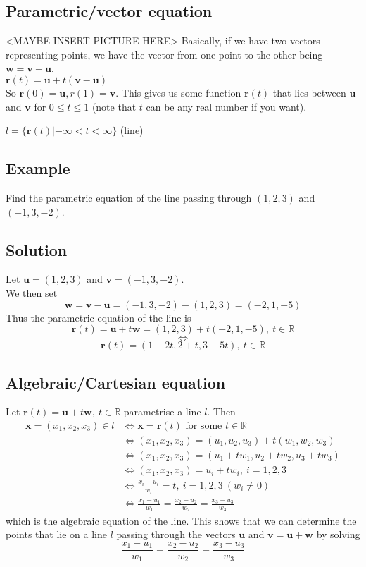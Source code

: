 \documentclass[11pt]{article}
\newcommand{\reals}{\mathbb{R}}
\renewcommand{\vec}[1]{\mathbf{#1}}
\begin{document}
\subsection{Parametric/vector equation}
<MAYBE INSERT PICTURE HERE>
Basically, if we have two vectors representing points, we have the vector from one point to the other being $\vec{w} = \vec{v} - \vec{u}$. \\
$\vec{r}(t) = \vec{u} + t(\vec{v} - \vec{u})$\\
So $\vec{r}(0) = \vec{u}, r(1)=\vec{v}$. This gives us some function $\vec{r}(t)$ that lies between $\vec{u}$ and $\vec{v}$ for $0 \leq t \leq 1$ (note that $t$ can be any real number if you want).

$l = \{ \vec{r}(t) | -\infty < t < \infty \}$ \hspace{2cm} (line)

\subsection{Example}
Find the parametric equation of the line passing through $(1, 2, 3)$ and $(-1, 3, -2)$.

\subsection{Solution}
Let $\vec{u} = (1, 2, 3)$ and $\vec{v} = (-1, 3, -2)$.\\
We then set
\[ \vec{w} = \vec{v} - \vec{u} = (-1, 3, -2) - (1, 2, 3) = (-2, 1, -5) \]
Thus the parametric equation of the line is
\[ \vec{r}(t) = \vec{u} + t\vec{w} = (1, 2, 3) + t(-2, 1, -5),\ t \in \reals \]
\[ \Leftrightarrow \]
\[ \vec{r}(t) = (1-2t, 2+t, 3-5t),\ t \in \reals\]

\subsection{Algebraic/Cartesian equation}
Let $\vec{r}(t) = \vec{u} + t\vec{w},\ t \in \reals$ parametrise a line $l$. Then
\begin{align*}
\vec{x} = (x_1, x_2, x_3) \in l &\Leftrightarrow \vec{x} = \vec{r}(t) \text{ for some } t \in \reals \\
&\Leftrightarrow (x_1, x_2, x_3) = (u_1, u_2, u_3) + t(w_1, w_2, w_3) \\
&\Leftrightarrow (x_1, x_2, x_3) = (u_1 + tw_1, u_2 + tw_2, u_3 + tw_3) \\
&\Leftrightarrow (x_1, x_2, x_3) = u_i + tw_i,\ i=1,2,3 \\
&\Leftrightarrow \frac{x_i - u_i}{w_i} = t, \ i=1,2,3\ (w_i \not= 0) \\
&\Leftrightarrow \frac{x_1 - u_1}{w_1} = \frac{x_2 - u_2}{w_2} = \frac{x_3 - u_3}{w_3}
\end{align*}
which is the algebraic equation of the line. This shows that we can determine the points that lie on a line $l$ passing through the vectors $\vec{u}$ and $\vec{v}=\vec{u}+\vec{w}$ by solving
\[ \frac{x_1 - u_1}{w_1} = \frac{x_2 - u_2}{w_2} = \frac{x_3 - u_3}{w_3} \]
\end{document}
